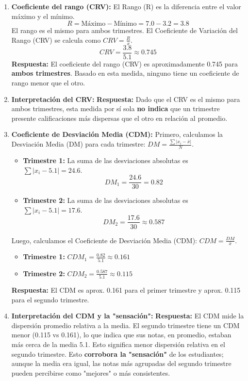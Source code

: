 \documentclass[12pt, a4paper]{article} %
\newcommand{\mean}[1]{\ensuremath{\bar{#1}}} %
\begin{document}
\begin{enumerate}
    \item \textbf{Coeficiente del rango (CRV):}
    El Rango (R) es la diferencia entre el valor máximo y el mínimo.
    \[ R = \text{Máximo} - \text{Mínimo} = \num{7,0} - \num{3,2} = \num{3,8} \]
    El rango es el mismo para ambos trimestres.
    El Coeficiente de Variación del Rango (CRV) se calcula como $CRV = \frac{R}{\mean{x}}$.
    \[ CRV = \frac{\num{3,8}}{\num{5,1}} \approx \num{0,745} \]
    \textbf{Respuesta:} El coeficiente del rango (CRV) es aproximadamente \num{0,745} para \textbf{ambos trimestres}. Basado en esta medida, ninguno tiene un coeficiente de rango menor que el otro.

    \item \textbf{Interpretación del CRV:}
    \textbf{Respuesta:} Dado que el CRV es el mismo para ambos trimestres, esta medida por sí sola \textbf{no indica} que un trimestre presente calificaciones más dispersas que el otro en relación al promedio.

    \item \textbf{Coeficiente de Desviación Media (CDM):}
    Primero, calculamos la Desviación Media (DM) para cada trimestre: $DM = \frac{\sum |x_i - \mean{x}|}{N}$.
    \begin{itemize}[nosep]
        \item \textbf{Trimestre 1:} La suma de las desviaciones absolutas es $\sum |x_i - \num{5,1}| = \num{24,6}$.
          \[ DM_1 = \frac{\num{24,6}}{30} = \num{0,82} \]
        \item \textbf{Trimestre 2:} La suma de las desviaciones absolutas es $\sum |x_i - \num{5,1}| = \num{17,6}$.
          \[ DM_2 = \frac{\num{17,6}}{30} \approx \num{0,587} \]
    \end{itemize}
    Luego, calculamos el Coeficiente de Desviación Media (CDM): $CDM = \frac{DM}{\mean{x}}$.
    \begin{itemize}[nosep]
        \item \textbf{Trimestre 1:} $CDM_1 = \frac{\num{0,82}}{\num{5,1}} \approx \num{0,161}$
        \item \textbf{Trimestre 2:} $CDM_2 = \frac{\num{0,587}}{\num{5,1}} \approx \num{0,115}$
    \end{itemize}
    \textbf{Respuesta:} El CDM es aprox. \num{0,161} para el primer trimestre y aprox. \num{0,115} para el segundo trimestre.

    \item \textbf{Interpretación del CDM y la "sensación":}
    \textbf{Respuesta:} El CDM mide la dispersión promedio relativa a la media. El segundo trimestre tiene un CDM menor (\num{0,115} vs \num{0,161}), lo que indica que sus notas, en promedio, estaban más cerca de la media \num{5,1}. Esto significa menor dispersión relativa en el segundo trimestre. Esto \textbf{corrobora la "sensación"} de los estudiantes; aunque la media era igual, las notas más agrupadas del segundo trimestre pueden percibirse como "mejores" o más consistentes.


\end{enumerate}
\end{document}
